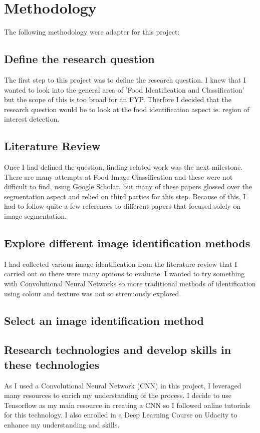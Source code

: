 \section{Methodology}
The following methodology were adapter for this project:

\subsection{ Define the research question}
The first step to this project was to define the research question.
I knew that I wanted to look into the general area of 'Food Identification and
Classification' but the scope of this is too broad for an FYP.
Therfore I decided that the research question would be to look at the food identification aspect ie. region of interest detection.

\subsection{ Literature Review}
Once I had defined the question, finding related work was the next milestone.
There are many attempts at Food Image Classification and these were not difficult to find, using Google Scholar, but many of these papers glossed over the segmentation aspect and relied on third parties for this step.
Because of this, I had to follow quite a few references to different papers that focused solely on image segmentation.

\subsection{ Explore different image identification methods}
I had collected various image identification from the literature review that I carried out so there were many options to evaluate.
I wanted to try something with Convolutional Neural Networks so more traditional
methods of identification using colour and texture was not so strenuously explored.

\subsection{Select an image identification method}

\subsection{Research technologies and develop skills in these technologies}
As I used a Convolutional Neural Network (CNN) in this project, I leveraged many resources to enrich my understanding of the process.
I decide to use Tensorflow as my main resource in creating a CNN so I followed online tutorials for this technology.
I also enrolled in a Deep Learning Course on Udacity to enhance my understanding and skills.

